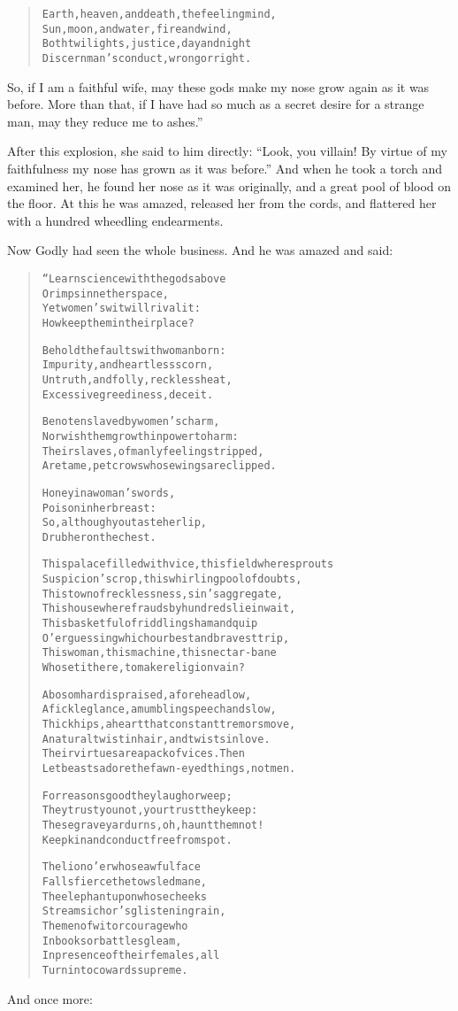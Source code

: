 \documentclass[article, twoside, 14pt]{memoir}
\renewenvironment{verbatim}{%
\begin{quote}%
\vskip -10pt%
\begin{alltt}\normalfont\large}{\end{alltt}%
\end{quote}%
\vskip -10pt
} %
\begin{document}
\begin{verbatim}
Earth, heaven, and death, the feeling mind,
Sun, moon, and water, fire and wind,
Both twilights, justice, day and night
Discern man's conduct, wrong or right.
\end{verbatim}
So, if I am a faithful wife, may these gods make my nose grow again
as it was before. More than that, if I have had so much as a secret
desire for a strange man, may they reduce me to ashes.”

After this explosion, she said to him directly:
``Look, you villain! By virtue of my faithfulness my nose has grown as it was before.''
And when he took a torch and examined her, he found her nose as it
was originally, and a great pool of blood on the floor. At this he
was amazed, released her from the cords, and flattered her with a
hundred wheedling endearments.

Now Godly had seen the whole business. And he was amazed and said:

\begin{verbatim}
“Learn science with the gods above
    Or imps in nether space,
Yet women's wit will rival it:
    How keep them in their place?

Behold the faults with woman born:
Impurity, and heartless scorn,
Untruth, and folly, reckless heat,
Excessive greediness, deceit.

Be not enslaved by women's charm,
Nor wish them growth in power to harm:
Their slaves, of manly feeling stripped,
Are tame, pet crows whose wings are clipped.

Honey in a woman's words,
    Poison in her breast:
So, although you taste her lip,
    Drub her on the chest.

This palace filled with vice, this field where sprouts
Suspicion's crop, this whirling pool of doubts,
This town of recklessness, sin's aggregate,
This house where frauds by hundreds lie in wait,
This basketful of riddling sham and quip
O'er guessing which our best and bravest trip,
This woman, this machine, this nectar-bane{\textemdash}
Who set it here, to make religion vain?

A bosom hard is praised, a forehead low,
A fickle glance, a mumbling speech and slow,
Thick hips, a heart that constant tremors move,
A natural twist in hair, and twists in love.
Their virtues are a pack of vices. Then
Let beasts adore the fawn-eyed things, not men.

For reasons good they laugh or weep;
They trust you not, your trust they keep:
These graveyard urns, oh, haunt them not!
Keep kin and conduct free from spot.

The lion o'er whose awful face
    Falls fierce the towsled mane,
The elephant upon whose cheeks
    Streams ichor's glistening rain,
The men of wit or courage who
    In books or battles gleam,
In presence of their females, all
    Turn into cowards supreme.
\end{verbatim}
And once more:
\end{document}
